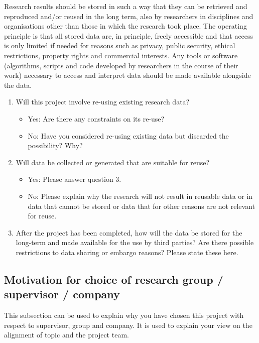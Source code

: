 \documentclass{article}
\begin{document}
Research results should be stored in such a way that they can be retrieved and reproduced and/or reused in the long term, also by researchers in disciplines and organisations other than those in which the research took place. The operating principle is that all stored data are, in principle, freely accessible and that access is only limited if needed for reasons such as privacy, public security, ethical restrictions, property rights and commercial interests. Any tools or software (algorithms, scripts and code developed by researchers in the course of their work) necessary to access and interpret data should be made available alongside the data.

\begin{enumerate}
  \item Will this project involve re-using existing research data?
        \begin{itemize}
          \item Yes: Are there any constraints on its re-use?
          \item No: Have you considered re-using existing data but discarded the possibility? Why?
        \end{itemize}

  \item Will data be collected or generated that are suitable for reuse?
        \begin{itemize}
          \item Yes: Please answer question 3.
          \item No: Please explain why the research will not result in reusable data or in data that cannot be stored or data that for other reasons are not relevant for reuse.
        \end{itemize}

  \item After the project has been completed, how will the data be stored for the long-term and made available for the use by third parties? Are there possible restrictions to data sharing or embargo reasons? Please state these here.
\end{enumerate}

\subsection{Motivation for choice of research group / supervisor / company}

This subsection can be used to explain why you have chosen this project with respect to supervisor, group and company. It is used to explain your view on the alignment of topic and the project team.
\end{document}
